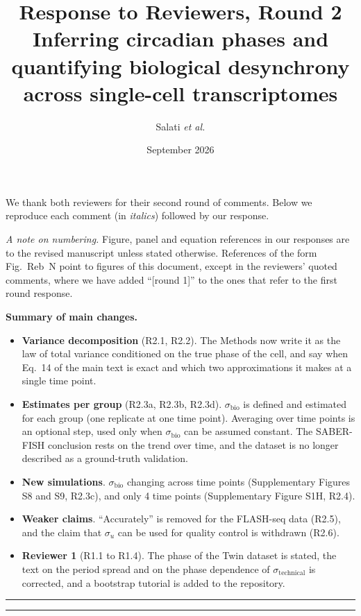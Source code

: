 \documentclass[11pt]{article}
\title{Response to Reviewers, Round 2\\[4pt]
\large Inferring circadian phases and quantifying biological desynchrony
across single-cell transcriptomes}
\author{Salati \textit{et al.}}
\date{September 2026}
\newcommand{\sigmabio}{$\sigma_\text{bio}$\xspace}
\newcommand{\sigmatech}{$\sigma_\text{technical}$\xspace}
\newcommand{\maineq}[1]{Eq.~#1 of the main text}
\begin{document}
\maketitle

\noindent We thank both reviewers for their second round of comments.
Below we reproduce each comment (in \textit{italics}) followed by our response.

\medskip
\noindent\textit{A note on numbering.} %
Figure, panel and equation references in our responses are to the revised manuscript
unless stated otherwise. References of the form Fig.~Reb~N point to figures of this document, except in the reviewers' quoted comments, where we have added ``[round 1]'' to the ones that refer to the first round response.

\bigskip
\noindent\textbf{Summary of main changes.}

\begin{itemize}
\item \textbf{Variance decomposition} (R2.1, R2.2). The Methods now write it as the law of total variance conditioned on the true phase of the cell, and say when \maineq{14} is exact and which two approximations it makes at a single time point.
\item \textbf{Estimates per group} (R2.3a, R2.3b, R2.3d). \sigmabio is defined and estimated for each group (one replicate at one time point). Averaging over time points is an optional step, used only when \sigmabio can be assumed constant. The SABER-FISH conclusion rests on the trend over time, and the dataset is no longer described as a ground-truth validation.
\item \textbf{New simulations}. \sigmabio changing across time points (Supplementary Figures S8 and S9, R2.3c), and only 4 time points (Supplementary Figure S1H, R2.4).
\item \textbf{Weaker claims}. ``Accurately'' is removed for the FLASH-seq data (R2.5), and the claim that $\sigma_u$ can be used for quality control is withdrawn (R2.6).
\item \textbf{Reviewer 1} (R1.1 to R1.4). The phase of the Twin dataset is stated, the text on the period spread and on the phase dependence of \sigmatech is corrected, and a bootstrap tutorial is added to the repository.
\end{itemize}

\bigskip
\hrule
\bigskip




\newpage



\bigskip
\hrule
\bigskip



\end{document}
